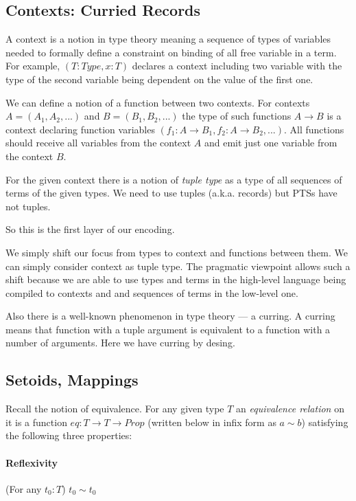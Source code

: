 \documentclass[11pt,oneside]{article}
\begin{document}
\subsection{Contexts: Curried Records}

A context is a notion in type theory meaning a sequence of types of variables
needed to formally define a constraint on binding of all free variable in a term.
For example, $( T : Type, x : T )$ declares a context including two variable with
the type of the second variable being dependent on the value of the first one.

We can define a notion of a function between two contexts.
For contexts $A = (A_1, A_2, ...)$ and $B = (B_1, B_2, ...)$
the type of such functions $A \rightarrow B$ is a context declaring
function variables $(f_1 : A \rightarrow B_1, f_2 : A \rightarrow B_2, ...)$.
All functions should receive all variables from the context $A$ and
emit just one variable from the context $B$.

For the given context there is a notion of {\em tuple type}
as a type of all sequences of terms of the given types.
We need to use tuples (a.k.a. records) but PTSs have not tuples.

So this is the first layer of our encoding.

We simply shift our focus from types to context and functions between them.
We can simply consider context as tuple type.
The pragmatic viewpoint allows such a shift because we are able to use
types and terms in the high-level language being compiled to contexts and and sequences of terms in the low-level one.

Also there is a well-known phenomenon in type theory --- a curring.
A curring means that function with a tuple argument is
equivalent to a function with a number of arguments.
Here we have curring by desing.

\subsection{Setoids, Mappings}

Recall the notion of equivalence. For any given type $T$
an {\em equivalence relation}
on it is a function $eq : T \rightarrow T \rightarrow Prop$
(written below in infix form as $a \sim b$) satisfying
the following three properties:

\paragraph{Reflexivity}
(For any $t_0 : T$) $t_0 \sim t_0$
\end{document}
